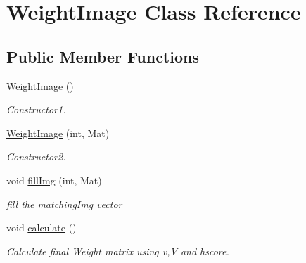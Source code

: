 \hypertarget{classWeightImage}{\section{\-Weight\-Image \-Class \-Reference}
\label{classWeightImage}
}
\subsection*{\-Public \-Member \-Functions}
\begin{DoxyCompactItemize}
\item 
\hypertarget{classWeightImage_a572c3f302ae6ddedf6d494c877fc7103}{\hyperlink{classWeightImage_a572c3f302ae6ddedf6d494c877fc7103}{\-Weight\-Image} ()}\label{classWeightImage_a572c3f302ae6ddedf6d494c877fc7103}

\begin{DoxyCompactList}\small\item\em \-Constructor1. \end{DoxyCompactList}\item 
\hypertarget{classWeightImage_aca25af973fdd071713b9ed73971a8ef9}{\hyperlink{classWeightImage_aca25af973fdd071713b9ed73971a8ef9}{\-Weight\-Image} (int, \-Mat)}\label{classWeightImage_aca25af973fdd071713b9ed73971a8ef9}

\begin{DoxyCompactList}\small\item\em \-Constructor2. \end{DoxyCompactList}\item 
\hypertarget{classWeightImage_ab1cb5407d869017ff76ee38ab52fc631}{void \hyperlink{classWeightImage_ab1cb5407d869017ff76ee38ab52fc631}{fill\-Img} (int, \-Mat)}\label{classWeightImage_ab1cb5407d869017ff76ee38ab52fc631}

\begin{DoxyCompactList}\small\item\em fill the matching\-Img vector \end{DoxyCompactList}\item 
\hypertarget{classWeightImage_aecd8990a967993eeee9403a0e0987cf5}{void \hyperlink{classWeightImage_aecd8990a967993eeee9403a0e0987cf5}{calculate} ()}\label{classWeightImage_aecd8990a967993eeee9403a0e0987cf5}

\begin{DoxyCompactList}\small\item\em \-Calculate final \-Weight matrix using v,\-V and hscore. \end{DoxyCompactList}\end{DoxyCompactItemize}

